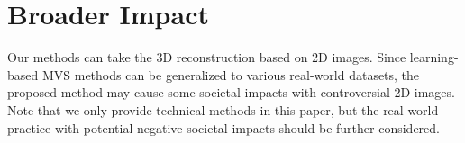 \documentclass[10pt]{article} \usepackage[preprint]{tmlr}
\begin{document}
\section{Broader Impact}
Our methods can take the 3D reconstruction based on 2D images. Since learning-based MVS methods can be generalized to various real-world datasets, the proposed method may cause some societal impacts with controversial 2D images. Note that we only provide technical methods in this paper, but the real-world practice with potential negative societal impacts should be further considered. 
\end{document}
